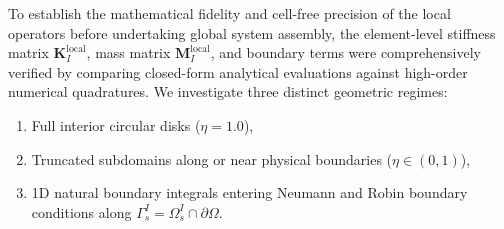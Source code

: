 \documentclass[VANCOUVER,Times1COL]{WileyNJD-v5}
\begin{document}
To establish the mathematical fidelity and cell-free precision of the local operators before undertaking global system assembly, the element-level stiffness matrix $\mathbf{K}_I^{\mathrm{local}}$, mass matrix $\mathbf{M}_I^{\mathrm{local}}$, and boundary terms were comprehensively verified by comparing closed-form analytical evaluations against high-order numerical quadratures. We investigate three distinct geometric regimes:
\begin{enumerate}
    \item Full interior circular disks ($\eta = 1.0$),
    \item Truncated subdomains along or near physical boundaries ($\eta \in (0, 1)$),
    \item 1D natural boundary integrals entering Neumann and Robin boundary conditions along $\Gamma_s^I = \Omega_s^I \cap \partial\Omega$.
\end{enumerate}
\end{document}
